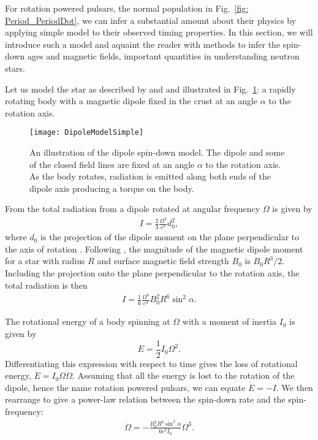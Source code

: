For rotation powered pulsars, the normal population in Fig.~\ref{fig:
Period_PeriodDot}, we can infer a substantial amount about their physics by
applying simple model to their observed timing properties. In this section,
we will introduce such a model and aquaint the reader with methods to infer
the spin-down ages and magnetic fields, important quantities in understanding
neutron stars.

Let us model the
star as described by \citet{Pacini1967} and \citet{Gold1968} and illustrated in
Fig.~\ref{fig: DipoleSpindownSimple}: a rapidly rotating
body with a magnetic dipole fixed in the crust at an angle $\alpha$ to the rotation
axis.
\begin{figure}[htb]
    \centering
    \texttt{[image: DipoleModelSimple]}
    \caption{An illustration of the dipole spin-down model. The dipole and some 
    of the closed field lines are fixed at an angle $\alpha$ to the rotation 
    axis. As the body rotates, radiation is emitted along both ends of the dipole
    axis producing a torque on the body.}
    \label{fig: DipoleSpindownSimple}
\end{figure}

From \citet{Landau2013classical} the total radiation from a dipole rotated at
angular frequency $\Omega$ is given by
\begin{align}
I = \frac{2}{3}\frac{\Omega^{4}}{c^{3}} d_{0}^{2},
\end{align}
where $d_0$ is the projection of the dipole moment on the plane perpendicular
to the axis of rotation \citep{Pacini1967}. Following \citet{Shapiro83}, the
magnitude of the magnetic dipole moment for a star with radius $R$ and surface magnetic
field strength $B_0$ is $B_{0}R^{3}/2$. Including the projection onto the
plane perpendicular to the rotation axis, the total radiation is then
\begin{align}
I = \frac{1}{6}\frac{\Omega^{4}}{c^{3}} B_0^2 R^{6} \sin^{2}\alpha.
\end{align}

The rotational energy of a body spinning at $\Omega$ with a moment of inertia
$I_{0}$ is given by
\begin{equation}
    E = \frac{1}{2}I_{0}\Omega^{2}.
\end{equation}
Differentiating this expression with respect to time gives the loss of rotational
energy, $\dot{E}=I_0 \Omega\dot{\Omega}$. Assuming that all the energy is lost
to the rotation of the dipole, hence the name rotation powered pulsars, we can
equate $\dot{E} = -I$. We then rearrange
to give a power-law relation between the spin-down rate and the spin-frequency:
\begin{align}
\dot{\Omega} = -\frac{B_0^{2} R^{6} \sin^{2}\alpha}{6 c^{3} I_0} \Omega^{3}.
\end{align}

